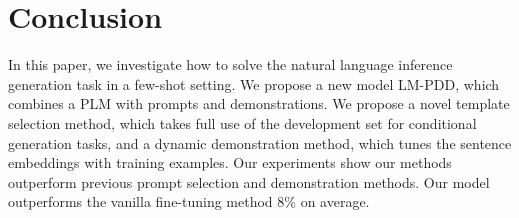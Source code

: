 \section{Conclusion}

In this paper, we investigate how to solve the natural language inference generation task in a few-shot setting. We propose a new model LM-PDD, which combines a PLM with prompts and demonstrations. We propose a novel template selection method, which takes full use of the development set for conditional generation tasks, and a dynamic demonstration method, which tunes the sentence embeddings with training examples. Our experiments show our methods outperform previous prompt selection and demonstration methods. Our model outperforms the vanilla fine-tuning method 8\% on average.